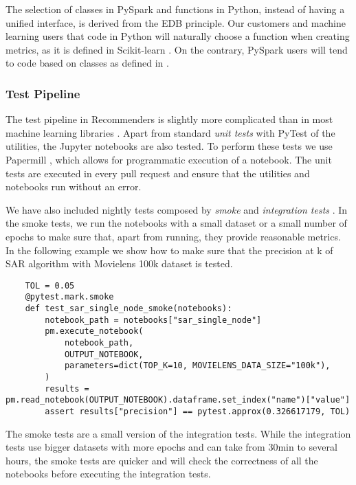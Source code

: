 The selection of classes in PySpark and functions in Python, instead of having a unified
interface, is derived from the EDB principle. Our customers and machine learning users
that code in Python will naturally choose a function when creating metrics, as it is
defined in Scikit-learn \cite{pedregosa2011scikit}. On the contrary, PySpark users 
will tend to code based on classes as defined in \cite{meng2016mllib}. 

\subsubsection{Test Pipeline}

The test pipeline in Recommenders is slightly more complicated than in most machine learning
libraries \cite{abadi2016tensorflow,paszke2017automatic,pedregosa2011scikit,ke2017lightgbm}.
Apart from standard {\em unit tests} with PyTest \cite{krekel2004pytest} of the utilities, 
the Jupyter notebooks are also tested. To perform these tests we use Papermill 
\cite{nteract2017papermill}, which allows for programmatic execution of a notebook. The
unit tests are executed in every pull request and ensure that the utilities and 
notebooks run without an error.

We have also included nightly tests composed by {\em smoke} and {\em integration tests}
\cite{gonzalez-fierro2018beginners}. In the smoke tests, we run the notebooks with a 
small dataset or a small number of epochs to make sure that, apart from running, they 
provide reasonable metrics. In the following example we show how to make sure that
the precision at k of SAR algorithm with Movielens 100k dataset is tested.

\begin{verbatim}
    TOL = 0.05
    @pytest.mark.smoke
    def test_sar_single_node_smoke(notebooks):
        notebook_path = notebooks["sar_single_node"]
        pm.execute_notebook(
            notebook_path,
            OUTPUT_NOTEBOOK,
            parameters=dict(TOP_K=10, MOVIELENS_DATA_SIZE="100k"),
        )
        results = pm.read_notebook(OUTPUT_NOTEBOOK).dataframe.set_index("name")["value"]
        assert results["precision"] == pytest.approx(0.326617179, TOL)
\end{verbatim}

The smoke tests are a small version of the integration tests. While the integration tests
use bigger datasets with more epochs and can take from 30min to several hours, the smoke tests are quicker and
will check the correctness of all the notebooks before executing the integration tests.

